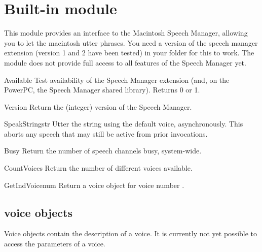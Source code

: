 \section{Built-in module }

\renewcommand{\indexsubitem}{(in module macspeech)}

This module provides an interface to the Macintosh Speech Manager,
allowing you to let the macintosh utter phrases. You need a version of
the speech manager extension (version 1 and 2 have been tested) in
your  folder for this to work. The module does not
provide full access to all features of the Speech Manager yet.

\begin{funcdesc}{Available}{}
Test availability of the Speech Manager extension (and, on the
PowerPC, the Speech Manager shared library). Returns 0 or 1. 
\end{funcdesc}

\begin{funcdesc}{Version}{}
Return the (integer) version of the Speech Manager.
\end{funcdesc}

\begin{funcdesc}{SpeakString}{str}
Utter the string  using the default voice,
asynchronously. This aborts any speech that may still be active from
prior  invocations.
\end{funcdesc}

\begin{funcdesc}{Busy}{}
Return the number of speech channels busy, system-wide.
\end{funcdesc}

\begin{funcdesc}{CountVoices}{}
Return the number of different voices available.
\end{funcdesc}

\begin{funcdesc}{GetIndVoice}{num}
Return a voice object for voice number .
\end{funcdesc}

\subsection{voice objects}
Voice objects contain the description of a voice. It is currently not
yet possible to access the parameters of a voice.

\renewcommand{\indexsubitem}{(voice object method)}


